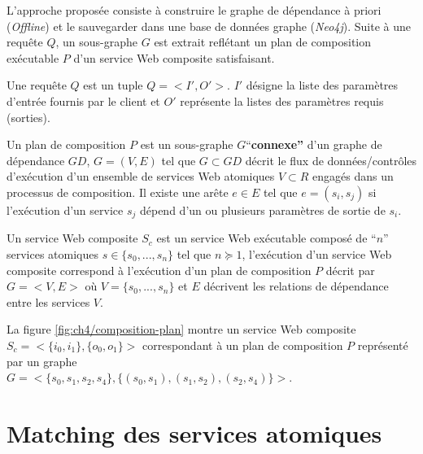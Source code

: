   L'approche proposée consiste à construire le graphe de dépendance à
  priori (\textit{Offline}) et le sauvegarder dans une base de données
  graphe (\textit{Neo4j}). Suite à une requête $Q$, un sous-graphe $G$
  est extrait reflétant un plan de composition exécutable $P$ d'un
  service Web composite satisfaisant.

  \begin{mydef}
    Une requête $Q$ est un tuple $Q = <I', O'>$. $I'$ désigne la liste
    des paramètres d'entrée fournis par le client et $O'$ représente
    la listes des paramètres requis (sorties).
  \end{mydef}

  

  \begin{mydef}
    Un plan de composition $P$ est un sous-graphe
    $G$``\textbf{connexe''} d'un graphe de dépendance $GD$, $G=(V,E)$
    tel que $G \subset GD$ décrit le flux de données/contrôles
    d'exécution d'un ensemble de services Web atomiques $V \subset R$
    engagés dans un processus de composition. Il existe une arête $e
    \in E$ tel que $e = (s_i, s_j)$ si l'exécution d'un service $s_j$
    dépend d'un ou plusieurs paramètres de sortie de $s_i$.
  \end{mydef}

  \begin{mydef}
    Un service Web composite $S_c$ est un service Web exécutable
    composé de ``$n$'' services atomiques $s \in \{s_0,..., s_n\}$ tel
    que $n \succeq 1$, l'exécution d'un service Web composite
    correspond à l'exécution d'un plan de composition $P$ décrit par
    $G=<V,E>$ où $V = \{s_0, ..., s_n\}$ et $E$ décrivent les
    relations de dépendance entre les services $V$.
  \end{mydef}

  La figure \ref{fig:ch4/composition-plan} montre un service Web
  composite $S_c = <\{i_0, i_1\}, \{o_0, o_1\}>$ correspondant à un
  plan de composition $P$ représenté par un graphe\\ $G =<\{s_0, s_1,
  s_2, s_4\}, \{(s_0, s_1), (s_1, s_2), (s_2, s_4)\}>$.

\section{Matching des services  atomiques}
\label{sec:ch4/matching}

